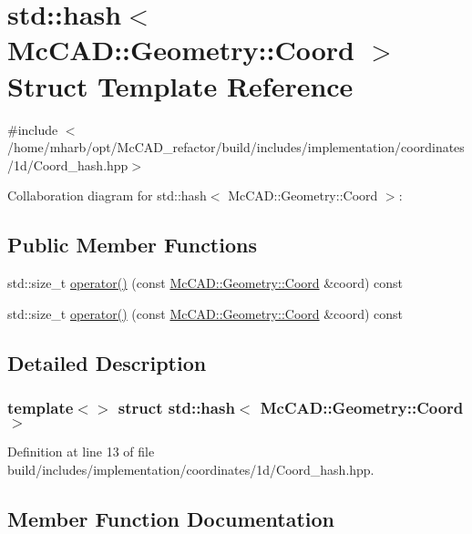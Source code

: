 \hypertarget{structstd_1_1hash_3_01McCAD_1_1Geometry_1_1Coord_01_4}{}\section{std\+:\+:hash$<$ Mc\+C\+AD\+:\+:Geometry\+:\+:Coord $>$ Struct Template Reference}
\label{structstd_1_1hash_3_01McCAD_1_1Geometry_1_1Coord_01_4}


{\ttfamily \#include $<$/home/mharb/opt/\+Mc\+C\+A\+D\+\_\+refactor/build/includes/implementation/coordinates/1d/\+Coord\+\_\+hash.\+hpp$>$}



Collaboration diagram for std\+:\+:hash$<$ Mc\+C\+AD\+:\+:Geometry\+:\+:Coord $>$\+:
\subsection*{Public Member Functions}
\begin{DoxyCompactItemize}
\item 
std\+::size\+\_\+t \hyperlink{structstd_1_1hash_3_01McCAD_1_1Geometry_1_1Coord_01_4_ab537af52eb4a5b8941a5b886289389c9}{operator()} (const \hyperlink{classMcCAD_1_1Geometry_1_1Coord}{Mc\+C\+A\+D\+::\+Geometry\+::\+Coord} \&coord) const
\item 
std\+::size\+\_\+t \hyperlink{structstd_1_1hash_3_01McCAD_1_1Geometry_1_1Coord_01_4_ab537af52eb4a5b8941a5b886289389c9}{operator()} (const \hyperlink{classMcCAD_1_1Geometry_1_1Coord}{Mc\+C\+A\+D\+::\+Geometry\+::\+Coord} \&coord) const
\end{DoxyCompactItemize}


\subsection{Detailed Description}
\subsubsection*{template$<$$>$\newline
struct std\+::hash$<$ Mc\+C\+A\+D\+::\+Geometry\+::\+Coord $>$}



Definition at line 13 of file build/includes/implementation/coordinates/1d/\+Coord\+\_\+hash.\+hpp.



\subsection{Member Function Documentation}
\mbox{\label{structstd_1_1hash_3_01McCAD_1_1Geometry_1_1Coord_01_4_ab537af52eb4a5b8941a5b886289389c9}} 

